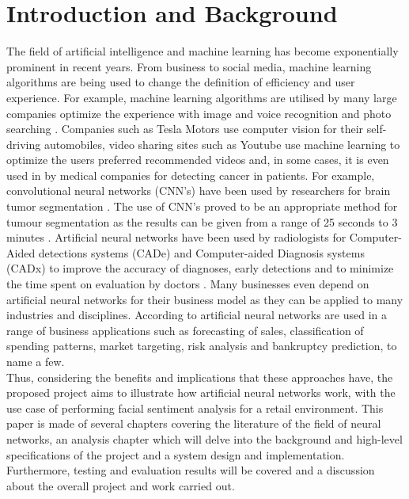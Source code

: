 

\chapter{Introduction and Background} 
The field of artificial intelligence and machine learning has become exponentially prominent in recent years.
From business to social media, machine learning algorithms are being used to change the definition of efficiency and user experience.
For example, machine learning algorithms are utilised by many large companies optimize the experience with image and voice recognition and photo searching \citep{adit}. Companies such as Tesla Motors use computer vision for their self-driving automobiles, video sharing sites such as Youtube use machine learning to optimize the users preferred recommended videos and, in some cases, it is even used in by medical companies for detecting cancer in patients. For example, convolutional neural networks (CNN's) have been used by researchers for brain tumor segmentation \citep{DBLP}. The use of CNN's proved to be an appropriate method for tumour segmentation as the results can be given from a range of 25 seconds to 3 minutes \citep{DBLP}. Artificial neural networks have been used by radiologists for Computer-Aided detections systems (CADe) and Computer-aided Diagnosis systems (CADx) to improve the accuracy of diagnoses, early detections and to minimize the time spent on evaluation by doctors \citep{CADe}. Many businesses even depend on artificial neural networks for their business model as they can be applied to many industries and disciplines. According to \citet{geocities}
artificial neural networks are used in a range of business applications such as forecasting of sales, classification of spending patterns, market targeting, risk analysis and bankruptcy prediction, to name a few. \\
Thus, considering the benefits and implications that these approaches have, the proposed project aims to illustrate how artificial neural networks work, with the use case of performing facial sentiment analysis for a retail environment. This paper is made of several chapters covering the literature of the field of neural networks, an analysis chapter which will delve into the background and high-level specifications of the project and a system design and implementation. Furthermore, testing and evaluation results will be covered and a discussion about the overall project and work carried out.